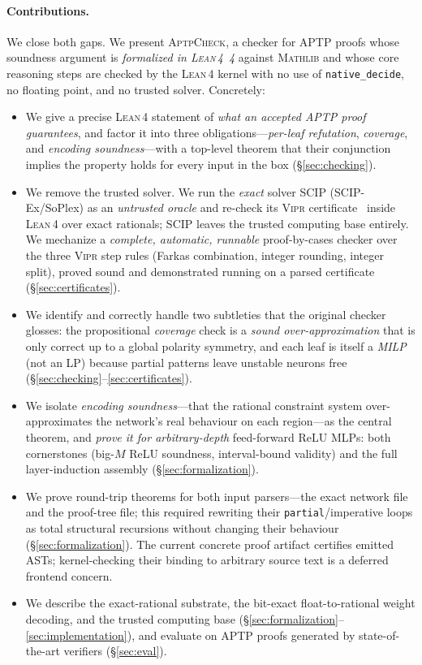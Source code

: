 \documentclass[runningheads]{llncs}
\newcommand{\vipr}{\textsc{Vipr}}
\newcommand{\scip}{\textsc{SCIP}}
\newcommand{\tool}{\textsc{AptpCheck}}
\newcommand{\lean}{\textsc{Lean\,4}}
\newcommand{\mathlib}{\textsc{Mathlib}}
\newcommand{\relu}{\ensuremath{\mathrm{ReLU}}}
\newcommand{\code}[1]{\texttt{#1}}
\begin{document}
\paragraph{Contributions.} We close both gaps. We present \tool, a checker for
APTP proofs whose soundness argument is \emph{formalized in \lean{}~4} against
\mathlib{} and whose core reasoning steps are checked by the \lean{} kernel with no
use of \code{native\_decide}, no floating point, and no trusted solver. Concretely:

\begin{itemize}
  \item We give a precise \lean{} statement of \emph{what an accepted APTP
    proof guarantees}, and factor it into three obligations---\emph{per-leaf
    refutation}, \emph{coverage}, and \emph{encoding soundness}---with a top-level
    theorem that their conjunction implies the property holds for every input in
    the box (\S\ref{sec:checking}).
  \item We remove the trusted solver. We run the \emph{exact} solver \scip{}
    (\scip-Ex/SoPlex) as an \emph{untrusted oracle} and re-check its \vipr{}
    certificate~\cite{cheung2017vipr,eifler2022exact} inside \lean{} over exact
    rationals; SCIP leaves the trusted computing base entirely. We mechanize a
    \emph{complete, automatic, runnable} proof-by-cases checker over the three \vipr{}
    step rules (Farkas combination, integer rounding, integer split), proved sound and
    demonstrated running on a parsed certificate (\S\ref{sec:certificates}).
  \item We identify and correctly handle two subtleties that the original checker
    glosses: the propositional \emph{coverage} check is a \emph{sound
    over-approximation} that is only correct up to a global polarity symmetry, and
    each leaf is itself a \emph{MILP} (not an LP) because partial patterns leave
    unstable neurons free (\S\ref{sec:checking}--\ref{sec:certificates}).
  \item We isolate \emph{encoding soundness}---that the rational constraint system
    over-approximates the network's real behaviour on each region---as the central
    theorem, and \emph{prove it for arbitrary-depth} feed-forward \relu{} MLPs: both
    cornerstones (big-$M$ ReLU soundness, interval-bound validity) and the full
    layer-induction assembly (\S\ref{sec:formalization}).
  \item We prove round-trip theorems for both input parsers---the exact network
    file and the proof-tree file; this required rewriting their
    \code{partial}/imperative loops as total structural recursions without changing
    their behaviour (\S\ref{sec:formalization}). The current concrete proof artifact
    certifies emitted ASTs; kernel-checking their binding to arbitrary source text is
    a deferred frontend concern.
  \item We describe the exact-rational substrate, the bit-exact float-to-rational
    weight decoding, and the trusted computing base
    (\S\ref{sec:formalization}--\ref{sec:implementation}), and evaluate on APTP
    proofs generated by state-of-the-art verifiers (\S\ref{sec:eval}).
\end{itemize}
\end{document}
